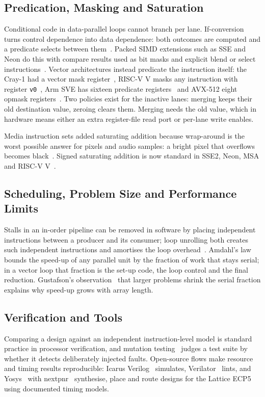 \subsection{Predication, Masking and Saturation}
Conditional code in data-parallel loops cannot branch per lane. If-conversion turns
control dependence into data dependence: both outcomes are computed and a predicate
selects between them~\cite{allen83}. Packed SIMD extensions such as SSE and Neon do
this with compare results used as bit masks and explicit blend or select
instructions~\cite{sse, armarm}. Vector architectures instead predicate the
instruction itself: the Cray-1 had a vector mask register~\cite{cray1}, RISC-V V masks
any instruction with register \texttt{v0}~\cite{rvv}, Arm SVE has sixteen predicate
registers~\cite{sve} and AVX-512 eight opmask registers~\cite{intelsdm}. Two policies
exist for the inactive lanes: merging keeps their old destination value, zeroing clears
them. Merging needs the old value, which in hardware means either an extra
register-file read port or per-lane write enables.

Media instruction sets added saturating addition because wrap-around is the worst
possible answer for pixels and audio samples: a bright pixel that overflows becomes
black~\cite{mmx}. Signed saturating addition is now standard in SSE2, Neon, MSA and
RISC-V V~\cite{intelsdm, armarm, msa, rvv}.

\subsection{Scheduling, Problem Size and Performance Limits}
Stalls in an in-order pipeline can be removed in software by placing independent
instructions between a producer and its consumer; loop unrolling both creates such
independent instructions and amortises the loop overhead~\cite{dongarra79, hp6}.
Amdahl's law~\cite{amdahl} bounds the speed-up of any parallel unit by the fraction of
work that stays serial; in a vector loop that fraction is the set-up code, the loop
control and the final reduction. Gustafson's observation~\cite{gustafson} that larger
problems shrink the serial fraction explains why speed-up grows with array length.

\subsection{Verification and Tools}
Comparing a design against an independent instruction-level model is standard practice
in processor verification, and mutation testing~\cite{demillo} judges a test suite by
whether it detects deliberately injected faults. Open-source flows make resource and
timing results reproducible: Icarus Verilog~\cite{icarus} simulates,
Verilator~\cite{verilator} lints, and Yosys~\cite{yosys} with nextpnr~\cite{nextpnr}
synthesise, place and route designs for the Lattice ECP5 using documented timing models.

